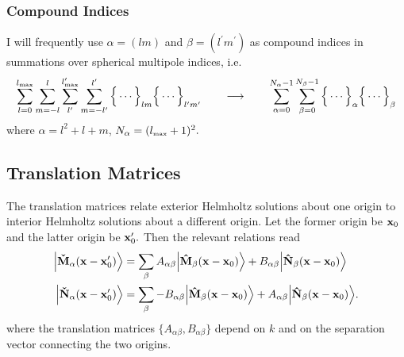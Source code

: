 \subsubsection*{Compound Indices}

I will frequently use $\alpha=(lm)$ and $\beta=(l^\prime m^\prime)$ 
as compound indices in summations over spherical multipole indices,
i.e. 
$$ \sum_{l=0}^{l_{\hbox{\tiny{max}}}} \sum_{m=-l}^{l}
   \sum_{l^\prime}^{l_{\hbox{\tiny{max}}}^\prime} \sum_{m=-l^\prime}^{l^\prime}
   \Big\{ \cdots \Big\}_{lm} 
   \Big\{ \cdots \Big\}_{l^\prime m^\prime} 
\qquad \longrightarrow \qquad 
   \sum_{\alpha=0}^{N_\alpha-1}
   \sum_{\beta=0}^{N_\beta-1}
   \Big\{ \cdots \Big\}_{\alpha} 
   \Big\{ \cdots \Big\}_{\beta}
$$
where 
$\alpha = l^2 + l + m$,
$N_\alpha=(l_{\hbox{\tiny{max}}}+1)^2.$ 

\subsection{Translation Matrices}

The translation matrices relate exterior Helmholtz solutions 
about one origin to interior Helmholtz solutions about a 
different origin. Let the former origin be $\mathbf{x}_0$ and the latter
origin be $\mathbf{x}_0^\prime.$ Then the relevant relations read
\begin{subequations}
\begin{align*}
 \Big|\mathbf{\check M}_\alpha(\mathbf{x} - \mathbf{x}_0^\prime) \Big\rangle
&= \sum_{\beta} 
     A_{\alpha\beta} \Big|\mathbf{\hat M}_\beta(\mathbf{x}-\mathbf{x}_0) \Big\rangle 
    +B_{\alpha\beta} \Big|\mathbf{\hat N}_\beta(\mathbf{x}-\mathbf{x}_0) \Big\rangle
\\
 \Big|\mathbf{\check N}_\alpha(\mathbf{x} - \mathbf{x}_0^\prime) \Big\rangle
&= \sum_{\beta} 
    -B_{\alpha\beta} \Big|\mathbf{\hat M}_\beta(\mathbf{x}-\mathbf{x}_0) \Big\rangle 
    +A_{\alpha\beta} \Big|\mathbf{\hat N}_\beta(\mathbf{x}-\mathbf{x}_0) \Big\rangle.
\end{align*}
\label{TranslationMatrixDefinition}
\end{subequations}
where the translation matrices $\{A_{\alpha\beta}, B_{\alpha\beta}\}$
depend on $k$ and on the separation
vector connecting the two origins.

